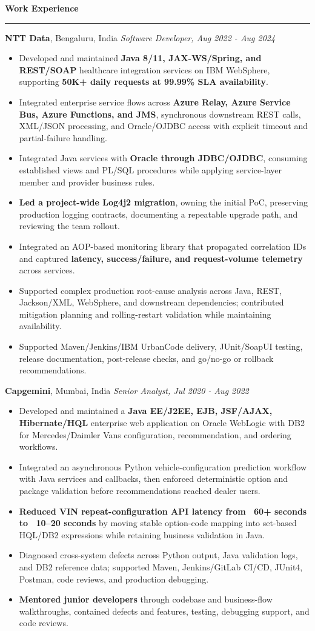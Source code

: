 \documentclass[11pt,letterpaper]{article}
\newcommand{\ressection}[1]{\Needspace{6\baselineskip}\vspace{8pt}\par\textbf{#1}\par\vspace{2pt}\hrule\vspace{5pt}}
\begin{document}
\ressection{Work Experience}
\textbf{NTT Data}, Bengaluru, India \hfill \textit{Software Developer, Aug 2022 - Aug 2024}
\begin{itemize}
  \item Developed and maintained \textbf{Java 8/11, JAX-WS/Spring, and REST/SOAP} healthcare integration services on IBM WebSphere, supporting \textbf{50K+ daily requests at 99.99\% SLA availability}.
  \item Integrated enterprise service flows across \textbf{Azure Relay, Azure Service Bus, Azure Functions, and JMS}, synchronous downstream REST calls, XML/JSON processing, and Oracle/OJDBC access with explicit timeout and partial-failure handling.
  \item Integrated Java services with \textbf{Oracle through JDBC/OJDBC}, consuming established views and PL/SQL procedures while applying service-layer member and provider business rules.
  \item \textbf{Led a project-wide Log4j2 migration}, owning the initial PoC, preserving production logging contracts, documenting a repeatable upgrade path, and reviewing the team rollout.
  \item Integrated an AOP-based monitoring library that propagated correlation IDs and captured \textbf{latency, success/failure, and request-volume telemetry} across services.
  \item Supported complex production root-cause analysis across Java, REST, Jackson/XML, WebSphere, and downstream dependencies; contributed mitigation planning and rolling-restart validation while maintaining availability.
  \item Supported Maven/Jenkins/IBM UrbanCode delivery, JUnit/SoapUI testing, release documentation, post-release checks, and go/no-go or rollback recommendations.
\end{itemize}
\textbf{Capgemini}, Mumbai, India \hfill \textit{Senior Analyst, Jul 2020 - Aug 2022}
\begin{itemize}
  \item Developed and maintained a \textbf{Java EE/J2EE, EJB, JSF/AJAX, Hibernate/HQL} enterprise web application on Oracle WebLogic with DB2 for Mercedes/Daimler Vans configuration, recommendation, and ordering workflows.
  \item Integrated an asynchronous Python vehicle-configuration prediction workflow with Java services and callbacks, then enforced deterministic option and package validation before recommendations reached dealer users.
  \item \textbf{Reduced VIN repeat-configuration API latency from ~60+ seconds to ~10--20 seconds} by moving stable option-code mapping into set-based HQL/DB2 expressions while retaining business validation in Java.
  \item Diagnosed cross-system defects across Python output, Java validation logs, and DB2 reference data; supported Maven, Jenkins/GitLab CI/CD, JUnit4, Postman, code reviews, and production debugging.
  \item \textbf{Mentored junior developers} through codebase and business-flow walkthroughs, contained defects and features, testing, debugging support, and code reviews.
\end{itemize}
\end{document}
